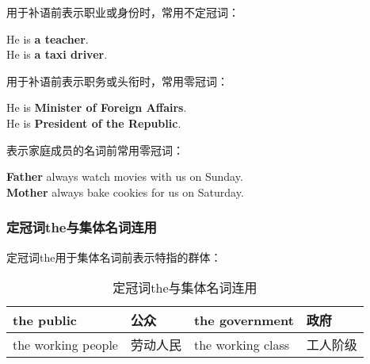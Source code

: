 \documentclass[UTF8]{ctexart}
\newcommand{\littf}[1]{{\hspace{3pt}\ttfamily #1}}
\begin{document}
\newpage

    用于补语前表示职业或身份时，常用不定冠词：
    \begin{center}
        \large\ttfamily
        He is \textbf{a teacher}.\\[2mm]
        He is \textbf{a taxi driver}.\\[4mm]
    \end{center}
    用于补语前表示职务或头衔时，常用零冠词：
    \begin{center}
        \large\ttfamily
        He is \textbf{Minister of Foreign Affairs}.\\[2mm]
        He is \textbf{President of the Republic}.\\[4mm]
    \end{center}
    表示家庭成员的名词前常用零冠词：
    \begin{center}
        \large\ttfamily
        \textbf{Father} always watch movies with us on Sunday.\\[2mm]
        \textbf{Mother} always bake cookies for us on Saturday.
    \end{center}

\subsubsection{定冠词\littf{the}与集体名词连用}
    定冠词\littf{the}用于集体名词前表示特指的群体：
    \begin{table}[h]
        \begin{center}
            \ttfamily
            \begin{tabular}{p{105pt}|p{60pt}|p{105pt}|p{60pt}}
                \hline
                the public&公众&the government&政府\\ \hline
                the working people&劳动人民&the working class&工人阶级\\ \hline
            \end{tabular}
            \rmfamily
            \caption{定冠词\littf{the}与集体名词连用}
        \end{center}
    \end{table}\vspace{-20pt}
\end{document}
